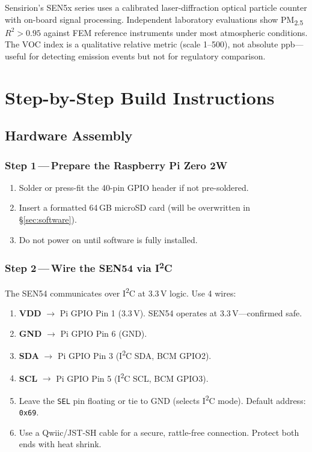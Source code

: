 \documentclass[11pt, letterpaper]{article}
\begin{document}
\begin{tcolorbox}[callout, title={Why the SEN54 specifically?}]
Sensirion's SEN5x series uses a calibrated laser-diffraction optical particle counter with
on-board signal processing. Independent laboratory evaluations show PM\textsubscript{2.5}
$R^2 > 0.95$ against FEM reference instruments under most atmospheric conditions. The VOC index
is a qualitative relative metric (scale 1--500), not absolute ppb---useful for detecting emission
events but not for regulatory comparison.
\end{tcolorbox}

\newpage

\section{Step-by-Step Build Instructions}

\subsection{Hardware Assembly}

\subsubsection{Step 1\,---\,Prepare the Raspberry Pi Zero 2W}
\begin{enumerate}
  \item Solder or press-fit the 40-pin GPIO header if not pre-soldered.
  \item Insert a formatted 64\,GB microSD card (will be overwritten in \S\ref{sec:software}).
  \item Do not power on until software is fully installed.
\end{enumerate}

\subsubsection{Step 2\,---\,Wire the SEN54 via I\textsuperscript{2}C}
The SEN54 communicates over I\textsuperscript{2}C at 3.3\,V logic. Use 4 wires:
\begin{enumerate}
  \item \textbf{VDD} $\to$ Pi GPIO Pin 1 (3.3\,V). SEN54 operates at 3.3\,V---confirmed safe.
  \item \textbf{GND} $\to$ Pi GPIO Pin 6 (GND).
  \item \textbf{SDA} $\to$ Pi GPIO Pin 3 (I\textsuperscript{2}C SDA, BCM GPIO2).
  \item \textbf{SCL} $\to$ Pi GPIO Pin 5 (I\textsuperscript{2}C SCL, BCM GPIO3).
  \item Leave the \texttt{SEL} pin floating or tie to GND (selects I\textsuperscript{2}C mode). Default address: \texttt{0x69}.
  \item Use a Qwiic/JST-SH cable for a secure, rattle-free connection. Protect both ends with heat shrink.
\end{enumerate}
\end{document}
